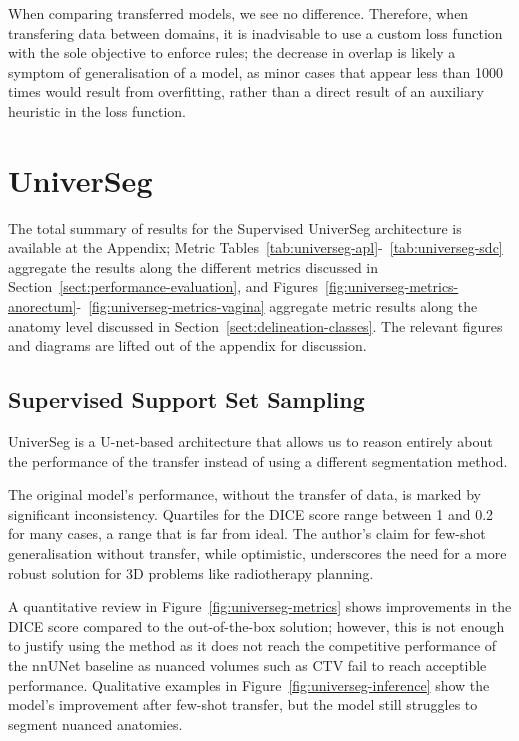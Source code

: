 \documentclass[11pt,twoside]{report}
\begin{document}
When comparing transferred models, we see no difference. Therefore, when transfering data between domains, it is inadvisable to use a custom loss function with the sole objective to enforce rules; the decrease in overlap is likely a symptom of generalisation of a model, as minor cases that appear less than 1000 times would result from overfitting, rather than a direct result of an auxiliary heuristic in the loss function. 


\clearpage

\section{UniverSeg}

The total summary of results for the Supervised UniverSeg architecture is available at the Appendix; Metric Tables~\ref{tab:universeg-apl}-~\ref{tab:universeg-sdc} aggregate the results along the different metrics discussed in Section~\ref{sect:performance-evaluation}, and Figures~\ref{fig:universeg-metrics-anorectum}-~\ref{fig:universeg-metrics-vagina} aggregate metric results along the anatomy level discussed in Section~\ref{sect:delineation-classes}. The relevant figures and diagrams are lifted out of the appendix for discussion.

\subsection{Supervised Support Set Sampling}

UniverSeg is a U-net-based architecture that allows us to reason entirely about the performance of the transfer instead of using a different segmentation method.

The original model's performance, without the transfer of data, is marked by significant inconsistency. Quartiles for the DICE score range between 1 and 0.2 for many cases, a range that is far from ideal. The author's claim for few-shot generalisation without transfer, while optimistic, underscores the need for a more robust solution for 3D problems like radiotherapy planning. 

A quantitative review in Figure~\ref{fig:universeg-metrics} shows improvements in the DICE score compared to the out-of-the-box solution; however, this is not enough to justify using the method as it does not reach the competitive performance of the nnUNet baseline as nuanced volumes such as CTV fail to reach acceptible performance. Qualitative examples in Figure~\ref{fig:universeg-inference} show the model's improvement after few-shot transfer, but the model still struggles to segment nuanced anatomies.
\end{document}

